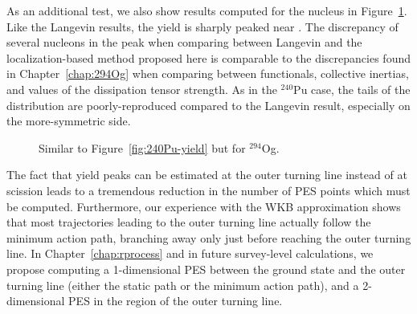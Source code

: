 As an additional test, we also show results computed for the nucleus {\Og} in Figure~\ref{fig:294Og-frags}. Like the Langevin results, the yield is sharply peaked near {\Pb}. The discrepancy of several nucleons in the peak when comparing between Langevin and the localization-based method proposed here is comparable to the discrepancies found in Chapter~\ref{chap:294Og} when comparing between functionals, collective inertias, and values of the dissipation tensor strength. As in the $^{240}$Pu case, the tails of the distribution are poorly-reproduced compared to the Langevin result, especially on the more-symmetric side.

\begin{figure}%
	\centering
	\qquad
	\caption{Similar to Figure~\ref{fig:240Pu-yield} but for $^{294}$Og.}%
	\label{fig:294Og-frags}%
\end{figure}

The fact that yield peaks can be estimated at the outer turning line instead of at scission leads to a tremendous reduction in the number of PES points which must be computed. Furthermore, our experience with the WKB approximation shows that most trajectories leading to the outer turning line actually follow the minimum action path, branching away only just before reaching the outer turning line. In Chapter~\ref{chap:rprocess} and in future survey-level calculations, we propose computing a 1-dimensional PES between the ground state and the outer turning line (either the static path or the minimum action path), and a 2-dimensional PES in the region of the outer turning line.


